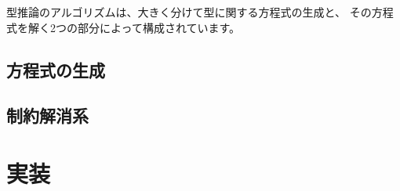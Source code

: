型推論のアルゴリズムは、大きく分けて型に関する方程式の生成と、
その方程式を解く2つの部分によって構成されています。



\subsection{方程式の生成}



\subsection{制約解消系}



\section{実装}



